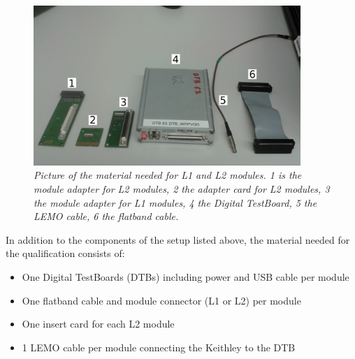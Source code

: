 \documentclass[a4paper,12pt,twoside]{article}
\begin{document}
\begin{figure} [h!] \centering 
\includegraphics[width=0.9\textwidth, angle=0] {./Figures/Material.jpg}
\caption{\em  \label{Material}
Picture of the material needed for L1 and L2 modules. 1 is the module adapter for L2 modules, 2 the adapter card for L2 modules, 3 the module adapter for L1 modules, 4 the Digital TestBoard, 5 the LEMO cable, 6 the flatband cable.}
\end{figure}

In addition to the components of the setup listed above, the material needed for the qualification consists of:

\begin{itemize}
\item One Digital TestBoards (DTBs) including power and USB cable per module
\item One flatband cable and module connector (L1 or L2) per module
\item One insert card for each L2 module
\item 1 LEMO cable per module connecting the Keithley to the DTB
\end{itemize}
\end{document}
